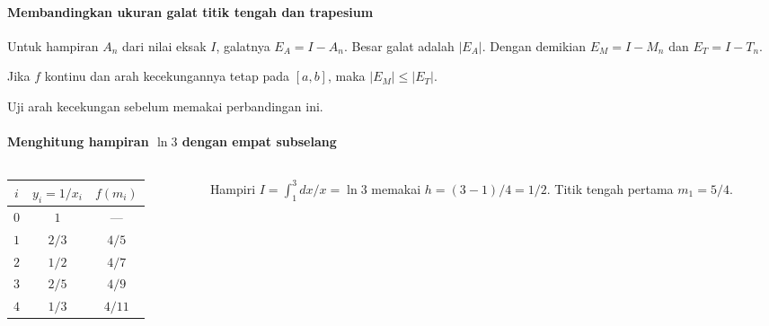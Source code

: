 \documentclass{../../kalkulus-ppt}
\begin{document}
\begin{frame}{\insertsection}
    \framesubtitle{Membandingkan ukuran galat titik tengah dan trapesium}
    \begin{definisi}
        Untuk hampiran $A_n$ dari nilai eksak $I$, galatnya $E_A=I-A_n$.
        Besar galat adalah $|E_A|$. Dengan demikian $E_M=I-M_n$
        dan $E_T=I-T_n$.
    \end{definisi}
    \begin{teorema}
        Jika $f$ kontinu dan arah kecekungannya tetap pada $[a,b]$,
        maka $|E_M|\le |E_T|$.
    \end{teorema}
    Uji arah kecekungan sebelum memakai perbandingan ini.
\end{frame}

\begin{frame}{\insertsection}
    \framesubtitle{Menghitung hampiran $\ln 3$ dengan empat subselang}
    \begin{columns}[c,onlytextwidth]
        \begin{column}{.39\textwidth}
            \centering
            \small
            \renewcommand{\arraystretch}{1.25}
            \begin{tabular}{c|c|c}
                $i$ & $y_i=1/x_i$ & $f(m_i)$\\ \hline
                $0$ & $1$ & ---\\
                $1$ & $2/3$ & $4/5$\\
                $2$ & $1/2$ & $4/7$\\
                $3$ & $2/5$ & $4/9$\\
                $4$ & $1/3$ & $4/11$
            \end{tabular}
        \end{column}
        \begin{column}{.57\textwidth}
            \begin{contoh}
                Hampiri $I=\int_1^3 dx/x=\ln 3$ memakai $h=(3-1)/4=1/2$.
                Titik tengah pertama $m_1=5/4$.
            \end{contoh}
        \end{column}
    \end{columns}
\end{frame}
\end{document}
